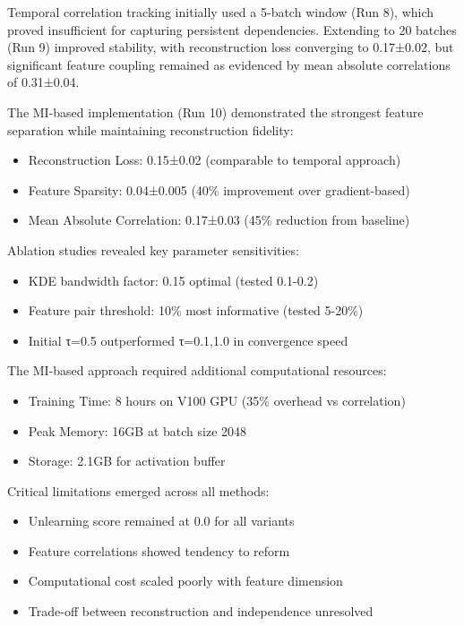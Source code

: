 \documentclass{article} %
\begin{document}
Temporal correlation tracking initially used a 5-batch window (Run 8), which proved insufficient for capturing persistent dependencies. Extending to 20 batches (Run 9) improved stability, with reconstruction loss converging to 0.17±0.02, but significant feature coupling remained as evidenced by mean absolute correlations of 0.31±0.04.

The MI-based implementation (Run 10) demonstrated the strongest feature separation while maintaining reconstruction fidelity:

\begin{itemize}
    \item Reconstruction Loss: 0.15±0.02 (comparable to temporal approach)
    \item Feature Sparsity: 0.04±0.005 (40\% improvement over gradient-based)
    \item Mean Absolute Correlation: 0.17±0.03 (45\% reduction from baseline)
\end{itemize}

Ablation studies revealed key parameter sensitivities:
\begin{itemize}
    \item KDE bandwidth factor: 0.15 optimal (tested 0.1-0.2)
    \item Feature pair threshold: 10\% most informative (tested 5-20\%)
    \item Initial τ=0.5 outperformed τ=0.1,1.0 in convergence speed
\end{itemize}

The MI-based approach required additional computational resources:
\begin{itemize}
    \item Training Time: 8 hours on V100 GPU (35\% overhead vs correlation)
    \item Peak Memory: 16GB at batch size 2048
    \item Storage: 2.1GB for activation buffer
\end{itemize}

Critical limitations emerged across all methods:
\begin{itemize}
    \item Unlearning score remained at 0.0 for all variants
    \item Feature correlations showed tendency to reform
    \item Computational cost scaled poorly with feature dimension
    \item Trade-off between reconstruction and independence unresolved
\end{itemize}
\end{document}
